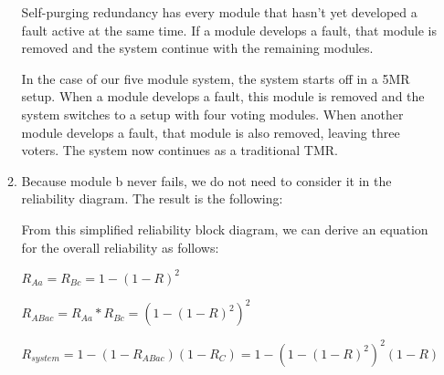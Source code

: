 \documentclass[a4paper,12pt]{article}
\begin{document}
\begin{enumerate}
\begin{enumerate}
                    Self-purging redundancy has every module that hasn't yet developed a fault active at the same time. If a module develops a fault, that module is removed and the system continue with the remaining modules.

                    In the case of our five module system, the system starts off in a 5MR setup. When a module develops a fault, this module is removed and the system switches to a setup with four voting modules. When another module develops a fault, that module is also removed, leaving three voters. The system now continues as a traditional TMR.

                \item Because module b never fails, we do not need to consider it in the reliability diagram. The result is the following:


                    From this simplified reliability block diagram, we can derive an equation for the overall reliability as follows:

                    $R_{Aa} = R_{Bc} = 1 - (1 - R)^2$

                    $R_{ABac} = R_{Aa} * R_{Bc} = (1 - (1 - R)^2)^2$

                    $R_{system} = 1 - (1 - R_{ABac})(1 - R_C) = 1 - (1 - (1 - R)^2)^2(1 - R) $


\end{enumerate}
\end{enumerate}
\end{document}
